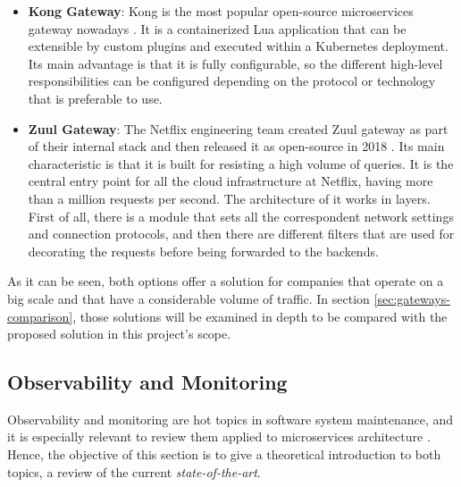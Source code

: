 \documentclass[english, 12pt, a4paper, sci, utf8, a-1b, online]{aaltothesis}
\begin{document}
\begin{itemize}
    \item \textbf{Kong Gateway}: Kong is the most popular open-source microservices gateway nowadays \cite{KongGateway}. It is a containerized Lua application that can be extensible by custom plugins and executed within a Kubernetes deployment. Its main advantage is that it is fully configurable, so the different high-level responsibilities can be configured depending on the protocol or technology that is preferable to use.
    \item \textbf{Zuul Gateway}: The Netflix engineering team created Zuul gateway as part of their internal stack and then released it as open-source in 2018 \cite{ZuulGateway}. Its main characteristic is that it is built for resisting a high volume of queries. It is the central entry point for all the cloud infrastructure at Netflix, having more than a million requests per second. The architecture of it works in layers. First of all, there is a module that sets all the correspondent network settings and connection protocols, and then there are different filters that are used for decorating the requests before being forwarded to the backends.
\end{itemize}

As it can be seen, both options offer a solution for companies that operate on a big scale and that have a considerable volume of traffic. In section \ref{sec:gateways-comparison}, those solutions will be examined in depth to be compared with the proposed solution in this project's scope.

\subsection{Observability and Monitoring}
\label{sec:observability-monitoring}


%

Observability and monitoring are hot topics in software system maintenance, and it is especially relevant to review them applied to microservices architecture \cite{ObservabilityvsMonitoring}. Hence, the objective of this section is to give a theoretical introduction to both topics, a review of the current \textit{state-of-the-art}.\\
\end{document}
